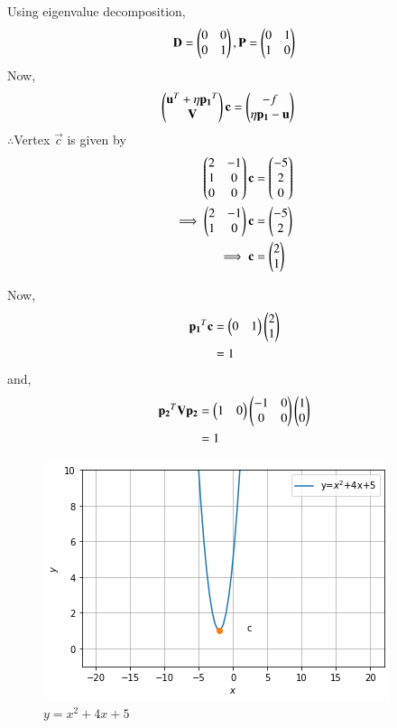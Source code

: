 \documentclass[journal,12pt,twocolumn]{IEEEtran}
\begin{document}
\begin{enumerate}
    Using eigenvalue decomposition,
    \begin{align}
        \mathbf{D} = \begin{pmatrix}0 & 0\\0 & 1\end{pmatrix} ,\mathbf{P}=\begin{pmatrix}0 & 1\\1 & 0\end{pmatrix}
    \end{align}
    Now,
\begin{align}
    \begin{pmatrix}\mathbf{u}^T + \eta\mathbf{p_1}^T \\ \mathbf{V}\end{pmatrix}\mathbf{c} &= \begin{pmatrix}-f \\ \eta\mathbf{p_1}-\mathbf{u}\end{pmatrix} 
\end{align}
    $\therefore$Vertex $\vec{c}$ is given by
    \begin{align}
        \begin{pmatrix}2 & -1 \\ 1 & 0 \\ 0 & 0\end{pmatrix}\mathbf{c} &= \begin{pmatrix}-5 \\ 2 \\ 0\end{pmatrix} \\
        \implies  \begin{pmatrix}2 & -1 \\ 1 & 0\end{pmatrix}\mathbf{c} &= \begin{pmatrix}-5 \\ 2\end{pmatrix}
        \\
        \implies \mathbf{c} &= \begin{pmatrix}2\\1\end{pmatrix}
    \end{align}
    
    Now,
    \begin{align}
        \mathbf{p_1}^T\mathbf{c} &= \begin{pmatrix}0 & 1\end{pmatrix}\begin{pmatrix}2 \\ 1\end{pmatrix}
        \\
        &= 1
    \end{align}
    and,
    \begin{align}
        \mathbf{p_2}^T\mathbf{V}\mathbf{p_2} &= \begin{pmatrix}1 & 0\end{pmatrix}\begin{pmatrix}-1 & 0\\0& 0\end{pmatrix}\begin{pmatrix}1 \\ 0\end{pmatrix}
        \\
        &= 1
    \end{align}
    
    \begin{figure}[!ht]
    \centering
    \includegraphics[width=\columnwidth]{figure5(2).png}
    \caption{$y=x^2+4x+5$}
    \label{ex4}	
    \end{figure}
    

\end{enumerate}
\end{document}
